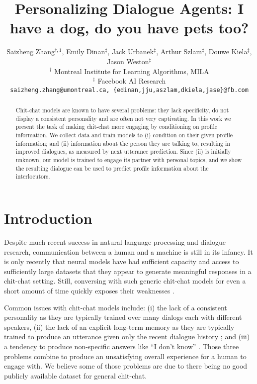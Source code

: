 \documentclass[11pt,a4paper]{article}
\title{Personalizing Dialogue Agents: I have a dog, do you have pets too?}
\author{Saizheng Zhang$^{\dagger,1}$, Emily Dinan$^{\ddagger}$, Jack Urbanek$^{\ddagger}$, Arthur Szlam$^{\ddagger}$, Douwe Kiela$^{\ddagger}$, Jason Weston$^{\ddagger}$\\
   $^{\dagger}$ Montreal Institute for Learning Algorithms, MILA\\$^{\ddagger}$ Facebook AI Research\\
  {\tt saizheng.zhang@umontreal.ca, \{edinan,jju,aszlam,dkiela,jase\}@fb.com}}
\date{}
\begin{document}
\maketitle
\addtocounter{footnote}{1}
\begin{abstract}
Chit-chat models are known to have several problems: they lack specificity, do not display a consistent personality and are often not very captivating.
In this work we present the task of
 making chit-chat more engaging by conditioning on 
 profile information.
We collect data and train models to (i) condition on
their given profile information; and (ii) information about the person they are talking to,
resulting in improved dialogues, as measured by next utterance prediction.
Since (ii) is initially unknown,
our model is trained to engage its partner with personal topics, and we show the resulting dialogue can be used to predict profile information about the interlocutors.
\end{abstract}

\newif\ifarxiv
\arxivfalse



\newif\ifnoarxiv
\noarxivtrue


\section{Introduction}

Despite much recent success in natural language processing and dialogue research, communication between a human and a machine is still in its infancy.
It is only recently that neural models have had sufficient capacity and access to sufficiently large datasets that they appear to generate meaningful responses in a chit-chat setting. Still, conversing with such generic chit-chat models for even a short amount of 
time quickly exposes their weaknesses \citep{serban2016generative,vinyals2015neural}.


Common issues with chit-chat models  
include:
(i) the lack of a consistent personality \citep{li2016persona} as they are typically trained over many dialogs each with different speakers,  (ii)
the lack of an explicit long-term memory as they are typically trained to produce an utterance given only the recent dialogue history \citep{vinyals2015neural}; and  (iii)
a tendency to produce non-specific answers like ``I don't know'' \citep{li2015diversity}. 
Those three problems combine to produce an unsatisfying overall experience for a human to engage with. We believe some of those problems are due to there being no good publicly available dataset for general chit-chat. 
\ifarxiv
\footnote{For example,  currently the  most general chit-chat dataset available in \url{http://parl.ai} a large repository of dialogue datasets is probably OpenSubtitles, which is based on movie scripts, not natural conversations.}.
\fi
\end{document}
